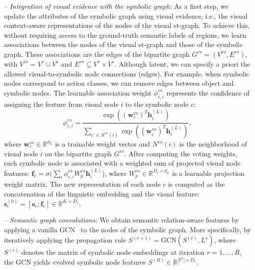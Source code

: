 \documentclass[runningheads]{llncs}
\newcommand{\mat}[1]{\mathbf{#1}}
\newcommand{\R}{\mathbb{R}}
\newcommand{\h}{\mathbf{h}}
\newcommand{\s}{\mathbf{s}}
\newcommand{\mysubparagraph}[1]{\smallskip\noindent-- \emph{#1:}}
\begin{document}
\mysubparagraph{Integration of visual evidence with the symbolic graph}
As a first step, we update the attributes of the symbolic graph using visual evidence, 
i.e., the visual context-aware representations of the nodes of the visual st-graph.
To achieve this, without requiring access to the ground-truth semantic labels of regions, we learn 
associations between the nodes of the visual st-graph and those of the symbolic graph.
These associations are the edges of the bipartite graph $G^{vs} = (V^{vs}, E^{vs})$, with $ V^{vs} = V^v \cup V^s$ and $E^{vs} \subseteq V^v \times V^s$. Although latent, we can specify a priori the allowed visual-to-symbolic node connections (edges). For example, when symbolic nodes correspond to action classes, we can remove edges between object and symbolic nodes.
The learnable association weight $\phi_{c,i}^{vs}$ represents the confidence of assigning the feature from visual node $i$ to the symbolic node $c$:
\begin{equation}
    \phi^{vs}_{c, i} = \frac{\exp\left(\left(\mat{w}_c^{vs}\right)^T \h_i^{(L)}\right)}{\sum_{c^\prime \in N^{vs}(i)} \exp\left(\left(\mat{w}_{c^\prime}^{vs}\right)^T \h_{i}^{(L)}\right)},
\end{equation}
where $\mat{w}_c^{vs} \in \R^{d_L}$ is a 
trainable weight vector and $N^{vs}(i)$ is the neighborhood of visual node $i$ on the bipartite graph $G^{vs}$.
After computing the voting weights, each symbolic node is associated with a weighted sum of projected visual node features:
$\mathbf{f}_c = \sigma(\sum_i  \phi^{vs}_{c, i} W_p^{vs} \h_i^{(L)}$),
where $W_p^{vs} \in \R^{D_s \times d_L}$ is a learnable projection weight matrix.  
The new representation of each node $c$ is computed as the 
concatenation of the linguistic embedding and the visual feature: $\s_c^{(0)} = \left[\s_c ; 
\mathbf{f}_c \right] \in \R^{K + D_s}$.

\mysubparagraph{Semantic graph convolutions} We obtain semantic relation-aware features by applying a vanilla GCN~\cite{Kipf:ICLR17} to the nodes of the symbolic graph. More specifically, by iteratively applying the propagation rule $S^{(r+1)} = \mathrm{GCN} (S^{(r)}, L^s)$, where $S^{(r)}$ denotes the matrix of symbolic node embeddings at iteration $r=1,\dots, R$, the GCN yields evolved symbolic node features $S^{(R)} \in \mathbb{R}^{|V^s| \times D_s}$.
\end{document}
